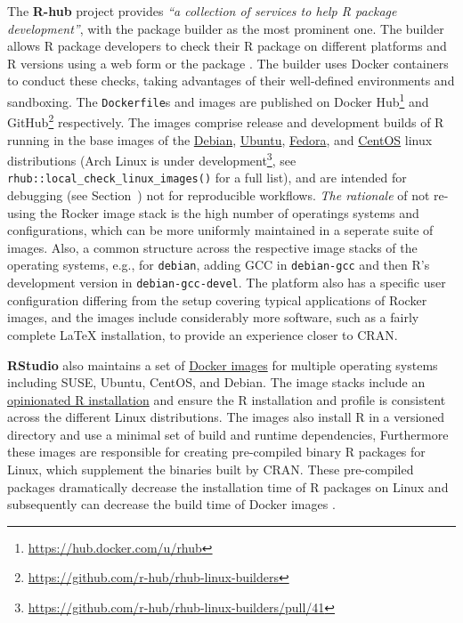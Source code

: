 \label{rhub} The \textbf{R-hub} project provides \emph{``a collection of
services to help R package development''}, with the package builder as
the most prominent one\citep{r-hub_docs_2019}. The builder allows R
package developers to check their R package on different platforms and R
versions using a web form or the package 
\citep{csardi_rhub_2019}. The builder uses Docker containers to conduct
these checks, taking advantages of their well-defined environments and
sandboxing. The \texttt{Dockerfile}s and images are published on Docker
Hub\footnote{\href{https://hub.docker.com/u/rhub}{https://hub.docker.com/u/rhub}}
and
GitHub\footnote{\href{https://github.com/r-hub/rhub-linux-builders}{https://github.com/r-hub/rhub-linux-builders}}
respectively. The images comprise release and development builds of R
running in the base images of the
\href{https://www.debian.org/}{Debian},
\href{https://ubuntu.com/}{Ubuntu},
\href{https://getfedora.org/}{Fedora}, and
\href{https://centos.org/}{CentOS} linux distributions (Arch Linux is
under
development\footnote{\href{https://github.com/r-hub/rhub-linux-builders/pull/41}{https://github.com/r-hub/rhub-linux-builders/pull/41}},
see \texttt{rhub::local\_check\_linux\_images()} for a full list), and
are intended for debugging (see Section~) not for
reproducible workflows. \emph{The rationale} of not re-using the Rocker
image stack is the high number of operatings systems and configurations,
which can be more uniformly maintained in a seperate suite of images.
Also, a common structure across the respective image stacks of the
operating systems, e.g., for \texttt{debian}, adding GCC in
\texttt{debian-gcc} and then R's development version in
\texttt{debian-gcc-devel}. The platform also has a specific user
configuration differing from the setup covering typical applications of
Rocker images, and the images include considerably more software, such
as a fairly complete LaTeX installation, to provide an experience closer
to CRAN.

\textbf{RStudio} also maintains a set of
\href{https://github.com/rstudio/r-docker}{Docker images} for multiple
operating systems including SUSE, Ubuntu, CentOS, and Debian. The image
stacks include an \href{https://github.com/rstudio/r-builds}{opinionated
R installation} and ensure the R installation and profile is consistent
across the different Linux distributions. The images also install R in a
versioned directory and use a minimal set of build and runtime
dependencies, Furthermore these images are responsible for creating
pre-compiled binary R packages for Linux, which supplement the binaries
built by CRAN. These pre-compiled packages dramatically decrease the
installation time of R packages on Linux and subsequently can decrease
the build time of Docker images \citep{lopp_package_2019}.


